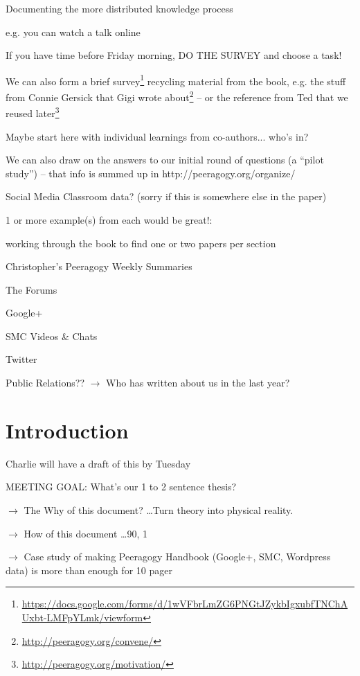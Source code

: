 \documentclass{acm_proc_article-sp}
\begin{document}
            Documenting the more distributed knowledge process

            e.g. you can watch a talk online

    If you have time before Friday morning, DO THE SURVEY and choose a task!

    We can also form a brief survey\footnote{\url{https://docs.google.com/forms/d/1wVFbrLmZG6PNGtJZykbIgxubfTNChAUxbt-LMFpYLmk/viewform}} recycling material from the book, e.g. the stuff from Connie Gersick that Gigi wrote about\footnote{\url{http://peeragogy.org/convene/}} -- or the reference from Ted that we reused later\footnote{\url{http://peeragogy.org/motivation/}}

    Maybe start here with individual learnings from co-authors... who's in?

    We can also draw on the answers to our initial round of questions (a ``pilot study'') -- that info is summed up in http://peeragogy.org/organize/

    Social Media Classroom data? (sorry if this is somewhere else in the paper)

    1 or more example(s) from each would be great!:

        working through the book to find one or two papers per section

        Christopher's Peeragogy Weekly Summaries

        The Forums

        Google+

        SMC Videos \& Chats

        Twitter

    Public Relations?? $\rightarrow$ Who has written about us in the last year?


\section{Introduction}

Charlie will have a draft of this by Tuesday

MEETING GOAL: What's our 1 to 2 sentence thesis?

$\rightarrow$ The Why of this document? \ldots Turn theory into physical reality.

$\rightarrow$ How of this document \ldots 90, 1 %

$\rightarrow$ Case study of making Peeragogy Handbook (Google+, SMC, Wordpress data) is more than enough for 10 pager
\end{document}
